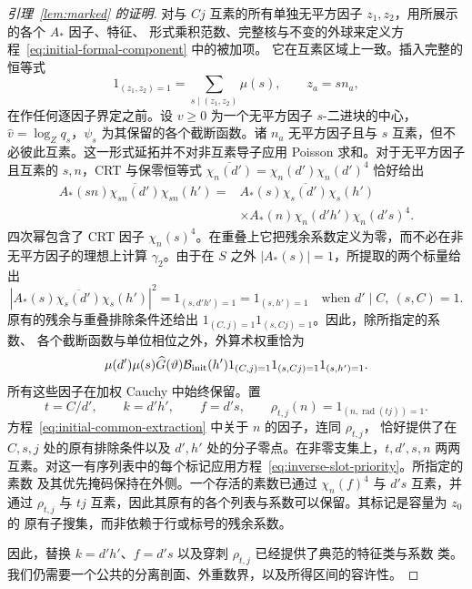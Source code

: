 \documentclass[11pt,a4paper]{article}
\numberwithin{equation}{section}
\numberwithin{figure}{section}
\theoremstyle{definition}
\theoremstyle{remark}
\begin{document}
\begin{proof}[引理~\ref{lem:marked} 的证明]
对与 \(Cj\) 互素的所有单独无平方因子 \(z_1,z_2\)，用所展示的各个 \(A_*\) 因子、特征、
形式乘积范数、完整核与不变的外球来定义方程~\eqref{eq:initial-formal-component} 中的被加项。
它在互素区域上一致。插入完整的恒等式
\[
 1_{(z_1,z_2)=1}=\sum_{s\mid(z_1,z_2)}\mu(s),\qquad z_a=sn_a,
\]
在作任何逐因子界定之前。设 \(v\ge0\) 为一个无平方因子 \(s\)-二进块的中心，
\(\widehat v=\log_Zq_s\)，\(\psi_s\) 为其保留的各个截断函数。诸 \(n_a\) 无平方因子且与 \(s\)
互素，但不必彼此互素。这一形式延拓并不对非互素导子应用 Poisson 求和。对于无平方因子且互素的
\(s,n\)，CRT 与保零恒等式 \(\overline{\chi_n(d')}=\chi_n(d')\chi_n(d')^4\) 恰好给出
\begin{equation}\label{eq:initial-common-extraction}
 \begin{split}
 A_*(sn)\overline{\chi_{sn}(d')}\chi_{sn}(h')
 ={}&A_*(s)\overline{\chi_s(d')}\chi_s(h')\\
 &\times A_*(n)\chi_n(d'h')\chi_n(d's)^4.
 \end{split}
\end{equation}
四次幂包含了 CRT 因子 \(\chi_n(s)^4\)。在重叠上它把残余系数定义为零，而不必在非
无平方因子的理想上计算 \(\gamma_2\)。由于在 \(S\) 之外 \(|A_*(s)|=1\)，所提取的两个标量给出
\[
 |A_*(s)\overline{\chi_s(d')}\chi_s(h')|^2
 =1_{(s,d'h')=1}=1_{(s,h')=1}
 \quad\text{when }d'\mid C,\ (s,C)=1.
\]
原有的残余与重叠排除条件还给出 \(1_{(C,j)=1}1_{(s,Cj)=1}\)。因此，除所指定的系数、
各个截断函数与单位相位之外，外算术权重恰为
\begin{equation}\label{eq:initial-outer-arithmetic}
 \mu(d')\mu(s)\widehat G(\vartheta)\mathcal B_{\rm init}(h')
 1_{(C,j)=1}1_{(s,Cj)=1}1_{(s,h')=1}.
\end{equation}
所有这些因子在加权 Cauchy 中始终保留。置
\[
 t=C/d',\qquad k=d'h',\qquad f=d's,\qquad
 \rho_{t,j}(n)=1_{(n,\operatorname{rad}(tj))=1}.
\]
方程~\eqref{eq:initial-common-extraction} 中关于 \(n\) 的因子，连同 \(\rho_{t,j}\)，
恰好提供了在 \(C,s,j\) 处的原有排除条件以及 \(d',h'\) 处的分子零点。在非零支集上，\(t,d',s,n\)
两两互素。对这一有序列表中的每个标记应用方程~\eqref{eq:inverse-slot-priority}。所指定的素数
及其优先掩码保持在外侧。一个存活的素数已通过 \(\chi_n(f)^4\) 与 \(d's\) 互素，并通过
\(\rho_{t,j}\) 与 \(tj\) 互素，因此其原有的各个列表与系数可以保留。其标记是容量为 \(z_0\) 的
原有子搜集，而非依赖于行或标号的残余系数。

因此，替换 \(k=d'h'\)、\(f=d's\) 以及穿刺 \(\rho_{t,j}\) 已经提供了典范的特征类与系数
类。我们仍需要一个公共的分离剖面、外重数界，以及所得区间的容许性。


\end{proof}
\end{document}
